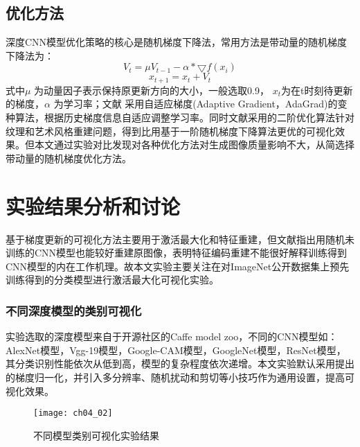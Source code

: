 \subsection{优化方法}

深度CNN模型优化策略的核心是随机梯度下降法，常用方法是带动量的随机梯度下降法为：
\begin{equation} \label{eq:ch04_12}
      V_{t}=\mu V_{t-1} -\alpha *\bigtriangledown {f(x_{i})}
\end{equation}          
\begin{equation} \label{eq:ch04_13}
     x_{t+1}=x_{t}+V_{t}
\end{equation}       
式中$\mu$ 为动量因子表示保持原更新方向的大小，一般选取0.9， $x_{t}$为在t时刻待更新的梯度，$\alpha$ 为学习率；文献\citep{Mahendran2015d,Mahendran2015} 采用自适应梯度(Adaptive Gradient，AdaGrad)\citep{Duchi2011}的变种算法，根据历史梯度信息自适应调整学习率。同时文献采用的二阶优化算法针对纹理和艺术风格重建问题，得到比用基于一阶随机梯度下降算法更优的可视化效果。但本文通过实验对比发现对各种优化方法对生成图像质量影响不大，从简选择带动量的随机梯度优化方法。
\section{实验结果分析和讨论}
 
基于梯度更新的可视化方法主要用于激活最大化和特征重建，但文献指出用随机未训练的CNN模型也能较好重建原图像，表明特征编码重建不能很好解释训练得到CNN模型的内在工作机理。故本文实验主要关注在对ImageNet公开数据集上预先训练得到的分类模型进行激活最大化可视化实验。

\subsubsection{不同深度模型的类别可视化} 
实验选取的深度模型来自于开源社区的Caffe model zoo，不同的CNN模型如：AlexNet模型\citep{Krizhevsky2012}，Vgg-19模型\citep{Simonyan2014a}，Google-CAM模型\citep{Zhou2015}，GoogleNet模型\citep{Szegedy2015}，ResNet模型\citep{he15}，其分类识别性能依次从低到高，模型的复杂程度依次递增。本文实验默认采用提出的梯度归一化，并引入多分辨率、随机扰动和剪切等小技巧作为通用设置，提高可视化效果。
\begin{figure}[!htbp]
      \centering
      \texttt{[image: ch04\_02]}
      \caption{不同模型类别可视化实验结果}
      \label{fig:ch04_02}
      \end{figure}

